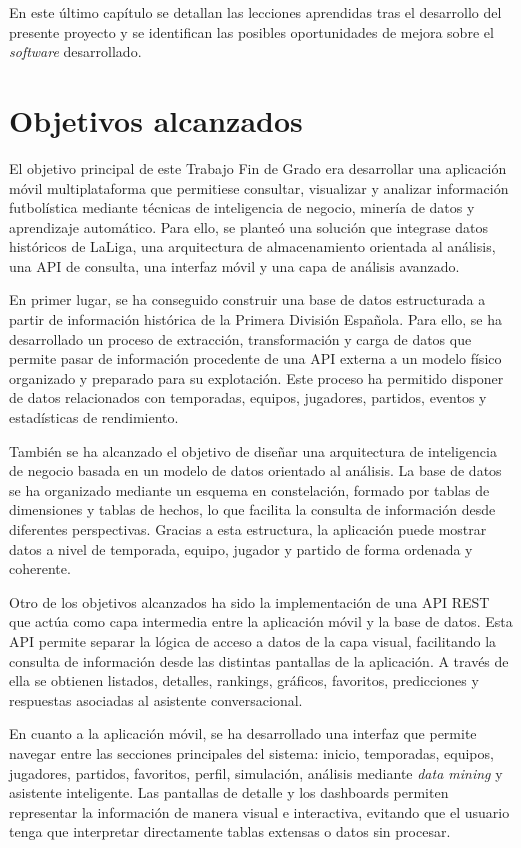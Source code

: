 En este último capítulo se detallan las lecciones aprendidas tras el desarrollo del presente proyecto y se identifican las posibles oportunidades de mejora sobre el \textit{software} desarrollado.

\section{Objetivos alcanzados}

El objetivo principal de este Trabajo Fin de Grado era desarrollar una aplicación móvil multiplataforma que permitiese consultar, visualizar y analizar información futbolística mediante técnicas de inteligencia de negocio, minería de datos y aprendizaje automático. Para ello, se planteó una solución que integrase datos históricos de LaLiga, una arquitectura de almacenamiento orientada al análisis, una API de consulta, una interfaz móvil y una capa de análisis avanzado.

En primer lugar, se ha conseguido construir una base de datos estructurada a partir de información histórica de la Primera División Española. Para ello, se ha desarrollado un proceso de extracción, transformación y carga de datos que permite pasar de información procedente de una API externa a un modelo físico organizado y preparado para su explotación. Este proceso ha permitido disponer de datos relacionados con temporadas, equipos, jugadores, partidos, eventos y estadísticas de rendimiento.

También se ha alcanzado el objetivo de diseñar una arquitectura de inteligencia de negocio basada en un modelo de datos orientado al análisis. La base de datos se ha organizado mediante un esquema en constelación, formado por tablas de dimensiones y tablas de hechos, lo que facilita la consulta de información desde diferentes perspectivas. Gracias a esta estructura, la aplicación puede mostrar datos a nivel de temporada, equipo, jugador y partido de forma ordenada y coherente.

Otro de los objetivos alcanzados ha sido la implementación de una API REST que actúa como capa intermedia entre la aplicación móvil y la base de datos. Esta API permite separar la lógica de acceso a datos de la capa visual, facilitando la consulta de información desde las distintas pantallas de la aplicación. A través de ella se obtienen listados, detalles, rankings, gráficos, favoritos, predicciones y respuestas asociadas al asistente conversacional.

En cuanto a la aplicación móvil, se ha desarrollado una interfaz que permite navegar entre las secciones principales del sistema: inicio, temporadas, equipos, jugadores, partidos, favoritos, perfil, simulación, análisis mediante \textit{data mining} y asistente inteligente. Las pantallas de detalle y los dashboards permiten representar la información de manera visual e interactiva, evitando que el usuario tenga que interpretar directamente tablas extensas o datos sin procesar.

